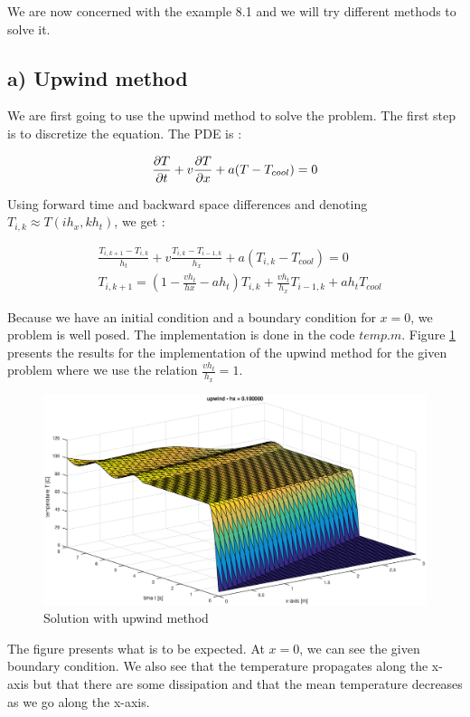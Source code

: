 We are now concerned with the example 8.1 and we will try different methods to solve it.
\subsection*{a) Upwind method} 

We are first going to use the upwind method to solve the problem. The first step is to discretize the equation. The PDE is :

$$\frac{\partial T}{\partial t}+v\frac{\partial T}{\partial x}+ a(T-T_{cool})=0$$

Using forward time and backward space differences and denoting $T_{i,k} \approx T(ih_x,kh_t)$, we get :

\begin{align*}
&\frac{T_{i,k+1}-T_{i,k}}{h_t}+v\frac{T_{i,k}-T_{i-1,k}}{h_x}+a(T_{i,k}-T_{cool})=0\\
&T_{i,k+1} = (1-\frac{vh_t}{hx}-ah_t)T_{i,k}+\frac{vh_t}{h_x}T_{i-1,k}+ah_tT_{cool}
\end{align*}

Because we have an initial condition and a boundary condition for $x=0$, we problem is well posed. The implementation is done in the code $temp.m$. Figure \ref{up} presents the results for the implementation of the upwind method for the given problem where we use the relation $\frac{vh_t}{h_x}=1$.

\begin{figure}
\begin{center}
\includegraphics[scale=0.4]{upwind.eps}
\caption{Solution with upwind method}
\label{up}
\end{center}
\end{figure}

The figure presents what is to be expected. At $x=0$, we can see the given boundary condition. We also see that the temperature propagates along the x-axis but that there are some dissipation and that the mean temperature decreases as we go along the x-axis.

